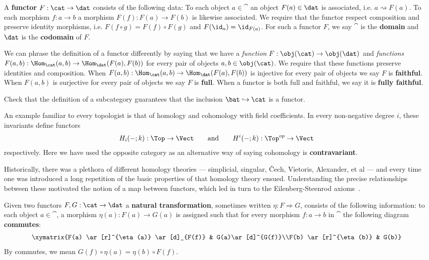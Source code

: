 \begin{defn}[Functor]
	A \textbf{functor} $F:\cat\to\dat$ consists of the following data: To each object $a\in\cat$ an object $F(a)\in\dat$ is associated, i.e. $a\rightsquigarrow F(a)$. To each morphism $f:a\to b$ a morphism $F(f):F(a)\to F(b)$ is likewise associated. We require that the functor respect composition and preserve identity morphisms, i.e. $F(f\circ g)=F(f)\circ F(g)$ and $F(\id_a)=\id_{F(a)}$. For such a functor $F$, we say $\cat$ is the \textbf{domain} and $\dat$ is the \textbf{codomain} of $F$.
\end{defn}
\begin{rmk}
We can phrase the definition of a functor differently by saying that we have a \emph{function} $F:\obj(\cat)\to\obj(\dat)$ and \emph{functions} $F(a,b):\Hom_{\cat}(a,b)\to\Hom_{\dat}(F(a),F(b))$ for every pair of objects $a,b\in\obj(\cat)$. We require that these functions preserve identities and composition. When $F(a,b):\Hom_{\cat}(a,b)\to\Hom_{\dat}(F(a),F(b))$ is injective for every pair of objects we say $F$ is \textbf{faithful}. When $F(a,b)$ is surjective for every pair of objects we say $F$ is \textbf{full}. When a functor is both full and faithful, we say it is \textbf{fully faithful}.
\end{rmk}

\begin{exr}
Check that the definition of a subcategory guarantees that the inclusion $\bat\hookrightarrow \cat$ is a functor.
\end{exr}

An example familiar to every topologist is that of homology and cohomology with field coefficients. In every non-negative degree $i$, these invariants define functors
\[
	H_i(-;k):\Top\to\Vect \qquad \mathrm{and} \qquad H^i(-;k):\Top^{op}\to\Vect
\]
respectively. Here we have used the opposite category as an alternative way of saying cohomology is \textbf{contravariant}.
     
Historically, there was a plethora of different homology theories --- simplicial, singular, \v{C}ech, Vietoris, Alexander, et al --- and every time one was introduced a long repetition of the basic properties of that homology theory ensued. Understanding the precise relationships between these motivated the notion of a map between functors, which led in turn to the Eilenberg-Steenrod axioms~\cite[p.335]{maclane-concepts}.

\begin{defn}
	Given two functors $F,G:\cat\to\dat$ a \textbf{natural transformation}, sometimes written $\eta:F \Rightarrow G$, consists of the following information: to each object $a\in\cat$, a morphism $\eta(a):F(a)\to G(a)$ is assigned such that for every morphism $f:a\to b$ in $\cat$ the following diagram \textbf{commutes}:
	\begin{displaymath}
		\xymatrix{F(a) \ar[r]^{\eta(a)} \ar[d]_{F(f)} & G(a)\ar[d]^{G(f)}\\F(b) \ar[r]^{\eta(b)} & G(b)}
	\end{displaymath}
	By commutes, we mean $G(f)\circ \eta(a)=\eta(b)\circ F(f)$.
\end{defn}

